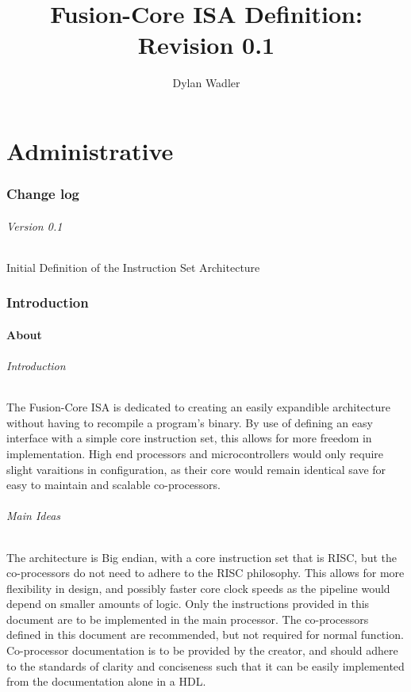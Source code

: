\documentclass[letterpaper, 11pt]{article}
\title{Fusion-Core ISA Definition: Revision 0.1}
\author{Dylan Wadler}
\begin{document}
\maketitle
\newpage
\tableofcontents


\newpage
\part{Administrative}
\section{Change log}
\paragraph{Version 0.1} Initial Definition of the Instruction Set Architecture

\section{Introduction}

\subsection{About}
\paragraph{Introduction}The Fusion-Core ISA is dedicated to creating an easily expandible architecture without having to 
recompile a program's binary. By use of defining an easy interface with a simple core instruction set, this allows for
more freedom in implementation. High end processors and microcontrollers would only require slight varaitions in
configuration, as their core would remain identical save for easy to maintain and scalable co-processors.
\paragraph{Main Ideas}The architecture is Big endian, with a core instruction set that is RISC, but the co-processors do not need to adhere to the RISC philosophy. This allows for more flexibility in design, and possibly faster core clock speeds as the pipeline would depend on smaller amounts of logic. Only the instructions provided in this document are to be implemented in the main processor. The co-processors defined in this document are recommended, but not required for normal function. Co-processor documentation is to be provided by the creator, and should adhere to the standards of clarity and conciseness such that it can be easily implemented from the documentation alone in a HDL. 
\end{document}
